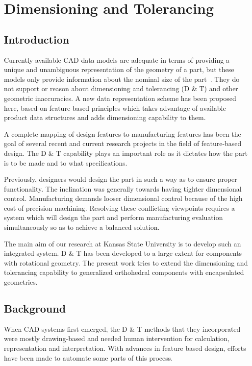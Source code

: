 \chapter{Dimensioning and Tolerancing}


    \section{Introduction}

        Currently available CAD data models are adequate in terms of providing
	a unique and unambiguous representation of the geometry of a part, but 
	these models
    only provide information about the nominal size of the part~\cite{Roy88}.
	They do not support or reason about dimensioning and tolerancing (D \& T)
	and other
    geometric inaccuracies. A new data representation scheme has been proposed 
	here, based on 
    feature-based principles which takes advantage of available product 
    data structures and adds dimensioning capability to them.

    A complete mapping of design features to manufacturing features has 
	been the goal of several recent and current research projects in the field 
	of feature-based design. The D \& T capability plays an important role 
    as it dictates how the part is to be made and to what specifications.

    Previously, designers would design the part in such a way as to 
    ensure proper functionality. The inclination was generally towards having 
	tighter dimensional control. Manufacturing demands looser 
	dimensional control because of the high cost of precision machining. 
	Resolving these
    conflicting viewpoints requires a system which will design the part and
    perform manufacturing evaluation simultaneously so as to achieve a 
	balanced solution.

    The main aim of our research at Kansas State University is to develop such
    an integrated system. D \& T has been developed to a 
	large extent for
    components with rotational geometry. The present work tries to 
	extend the dimensioning and tolerancing capability 
    to generalized orthohedral components with encapsulated geometries.


	\section{Background}


	When CAD systems first emerged, the D \& T 
	methods that they incorporated were mostly drawing-based and needed human 
	intervention for calculation, representation and interpretation. With 
	advances in feature based design, efforts have been made to automate some 
	parts of this process. 


